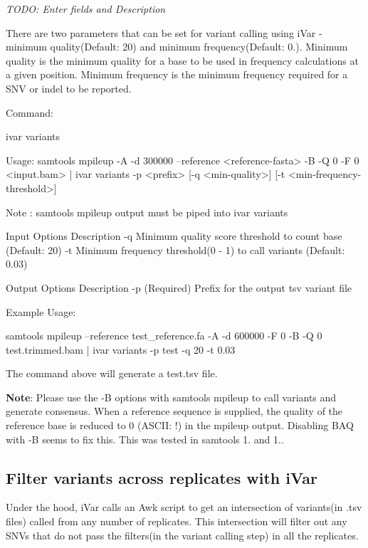 {\itshape T\+O\+DO\+: Enter fields and Description}

There are two parameters that can be set for variant calling using i\+Var -\/ minimum quality(\+Default\+: 20) and minimum frequency(Default\+: 0.). Minimum quality is the minimum quality for a base to be used in frequency calculations at a given position. Minimum frequency is the minimum frequency required for a S\+NV or indel to be reported.

Command\+: 
\begin{DoxyCode}
ivar variants

Usage: samtools mpileup -A -d 300000 --reference <reference-fasta> -B -Q 0 -F 0 <input.bam> | ivar variants
       -p <prefix> [-q <min-quality>] [-t <min-frequency-threshold>]

Note : samtools mpileup output must be piped into ivar variants

Input Options    Description
           -q    Minimum quality score threshold to count base (Default: 20)
           -t    Minimum frequency threshold(0 - 1) to call variants (Default: 0.03)

Output Options   Description
           -p    (Required) Prefix for the output tsv variant file
\end{DoxyCode}


Example Usage\+: 
\begin{DoxyCode}
samtools mpileup --reference test\_reference.fa -A -d 600000 -F 0 -B -Q 0 test.trimmed.bam | ivar variants
       -p test -q 20 -t 0.03
\end{DoxyCode}


The command above will generate a test.\+tsv file.

{\bfseries Note}\+: Please use the -\/B options with {\ttfamily samtools mpileup} to call variants and generate consensus. When a reference sequence is supplied, the quality of the reference base is reduced to 0 (A\+S\+C\+II\+: !) in the mpileup output. Disabling B\+AQ with -\/B seems to fix this. This was tested in samtools 1. and 1..\hypertarget{manualpage_autotoc_md6}{}\subsection{Filter variants across replicates with i\+Var}\label{manualpage_autotoc_md6}
Under the hood, i\+Var calls an Awk script to get an intersection of variants(in .tsv files) called from any number of replicates. This intersection will filter out any S\+N\+Vs that do not pass the filters(in the variant calling step) in all the replicates.


